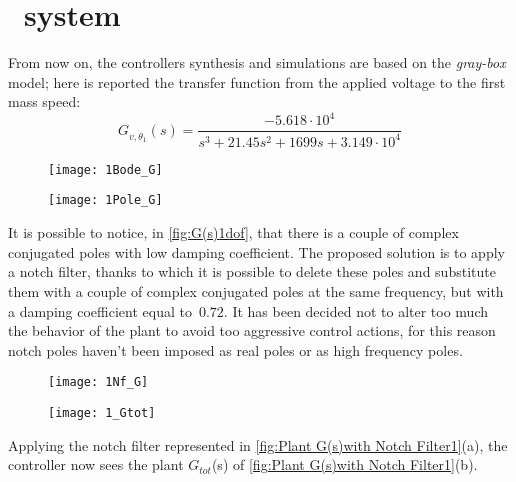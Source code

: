 \label{sec:FD_control}
\section{\onedof\ system}
From now on, the controllers synthesis and simulations are based on the \textit{gray-box} model; here is reported the transfer function from the applied voltage to the first mass speed: \\
\[	
G_{v, \dot \theta_1}(s)=
\frac{-5.618 \cdot 10^{4}}{{s^3 + 21.45 s^{2}}+1699 s+3.149 \cdot 10^{4}}
\]

\begin{figure*}[h]
	\centering
	\begin{subfigure}{0.55\columnwidth}
		\texttt{[image: 1Bode\_G]}
	\end{subfigure}
	\begin{subfigure}{0.4\columnwidth}
		\texttt{[image: 1Pole\_G]}
	\end{subfigure}
	\caption{$G_{v, \dot \theta_1}(s)$}
	\label{fig:G(s)1dof}
\end{figure*}

It is possible to notice, in \cref{fig:G(s)1dof}, that there is a couple of complex conjugated poles with low damping coefficient. The proposed solution is to apply a notch filter, thanks to which it is possible to delete these poles and substitute them with a couple of complex conjugated poles at the same frequency, but with a damping coefficient equal to~$0.72$. It has been decided not to alter too much the behavior of the plant to avoid too aggressive control actions, for this reason notch poles haven't been imposed as real poles or as high frequency poles.

\begin{figure*}[h]
	\centering
	\begin{subfigure}{0.47\columnwidth}
		\texttt{[image: 1Nf\_G]}
	\end{subfigure}
	\begin{subfigure}{0.47\columnwidth}
		\texttt{[image: 1\_Gtot]}
	\end{subfigure}
	\caption{Plant $G(s)$ with Notch Filter $N_f(s)$: $G_{tot}(s)$}
	\label{fig:Plant G(s)with Notch Filter1}
\end{figure*}


Applying the notch filter represented in \cref{fig:Plant G(s)with Notch Filter1}(a), the controller now sees the plant $G_{tot}$(s) of \cref{fig:Plant G(s)with Notch Filter1}(b).

